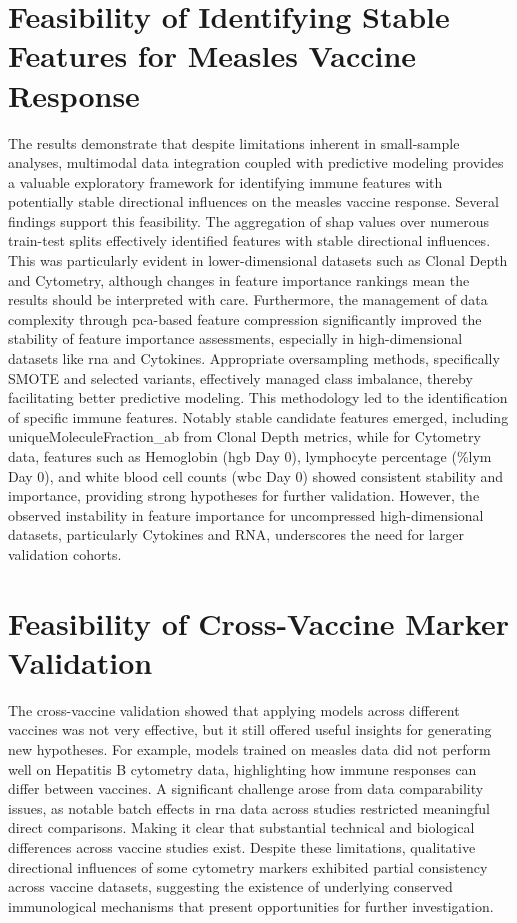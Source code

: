 \documentclass[12pt,a4paper]{report}
\begin{document}
\section{Feasibility of Identifying Stable Features for Measles Vaccine Response}
\noindent
The results demonstrate that despite limitations inherent in small-sample analyses, multimodal data integration coupled with predictive modeling provides a valuable exploratory framework for identifying immune features with potentially stable directional influences on the measles vaccine response. Several findings support this feasibility. The aggregation of \acrshort{shap} values over numerous train-test splits effectively identified features with stable directional influences. This was particularly evident in lower-dimensional datasets such as Clonal Depth and Cytometry, although changes in feature importance rankings mean the results should be interpreted with care. Furthermore, the management of data complexity through \acrshort{pca}-based feature compression significantly improved the stability of feature importance assessments, especially in high-dimensional datasets like \acrshort{rna} and Cytokines. Appropriate oversampling methods, specifically SMOTE and selected variants, effectively managed class imbalance, thereby facilitating better predictive modeling. This methodology led to the identification of specific immune features. Notably stable candidate features emerged, including uniqueMoleculeFraction\_ab from Clonal Depth metrics, while for Cytometry data, features such as Hemoglobin (\acrshort{hgb} Day 0), lymphocyte percentage (\%\acrshort{lym} Day 0), and white blood cell counts (\acrshort{wbc} Day 0) showed consistent stability and importance, providing strong hypotheses for further validation. However, the observed instability in feature importance for uncompressed high-dimensional datasets, particularly Cytokines and RNA, underscores the need for larger validation cohorts.

\section{Feasibility of Cross-Vaccine Marker Validation}
\noindent
The cross-vaccine validation showed that applying models across different vaccines was not very effective, but it still offered useful insights for generating new hypotheses. For example, models trained on measles data did not perform well on Hepatitis B cytometry data, highlighting how immune responses can differ between vaccines. A significant challenge arose from data comparability issues, as notable batch effects in \acrshort{rna} data across studies restricted meaningful direct comparisons. Making it clear that substantial technical and biological differences across vaccine studies exist. Despite these limitations, qualitative directional influences of some cytometry markers exhibited partial consistency across vaccine datasets, suggesting the existence of underlying conserved immunological mechanisms that present opportunities for further investigation.
\end{document}
